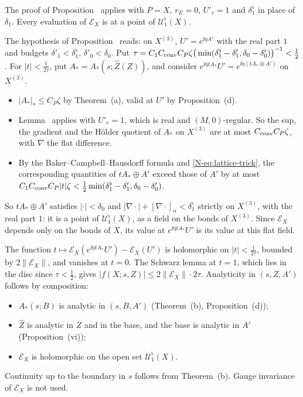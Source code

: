 \begin{detail}\label{d11b:gl-composed}
The proof of Proposition~ applies with $P=X$, $r_E=0$, $U'_r=1$ and $\delta_1^\flat$ in place of $\delta_1$. Every evaluation of $\mathcal E_X$ is at a point of $\mathcal U^\flat_1(X)$.
\end{detail}

\begin{step}
The hypothesis of Proposition~ reads: on $X^{(3)}$, $U'=e^{\ii\eta A'}$ with the real part $1$ and budgets $\delta'_1<\delta_1^\flat$, $\delta'_0<\delta_0$. Put $\tau=C_1C_{\rm conv}C_P\zeta\big(\min(\delta_1^\flat-\delta'_1,\delta_0-\delta'_0)\big)^{-1}<\frac12$. For $|t|<\frac1{2\tau}$, put $A_*=A_*(s;\hat Z(Z))$, and consider $e^{\ii\eta tA_*}U'=e^{\ii\eta(tA_*\oplus A')}$ on $X^{(3)}$.
\begin{itemize}
\item $|A_*|_*\le C_P\zeta$ by Theorem~(a), valid at $U'$ by Proposition~(d).
\item Lemma~ applies with $U'_r=1$, which is real and $(M,0)$-regular. So the sup, the gradient and the Hölder quotient of $A_*$ on $X^{(3)}$ are at most $C_{\rm conv}C_P\zeta$, with $\nabla$ the flat difference.
\item By the Baker--Campbell--Hausdorff formula and \eqref{N-eq:lattice-trick}, the corresponding quantities of $tA_*\oplus A'$ exceed those of $A'$ by at most $C_1C_{\rm conv}C_P|t|\zeta<\frac12\min(\delta_1^\flat-\delta'_1,\delta_0-\delta'_0)$.
\end{itemize}
So $tA_*\oplus A'$ satisfies $|\cdot|<\delta_0$ and $|\nabla\cdot|+[\nabla\cdot]_\alpha<\delta_1^\flat$ strictly on $X^{(3)}$, with the real part $1$: it is a point of $\mathcal U^\flat_1(X)$, as a field on the bonds of $X^{(3)}$. Since $\mathcal E_X$ depends only on the bonds of $X$, its value at $e^{\ii\eta tA_*}U'$ is its value at this flat field.
\end{step}

\begin{step}
The function $t\mapsto\mathcal E_X(e^{\ii\eta tA_*}U')-\mathcal E_X(U')$ is holomorphic on $|t|<\frac1{2\tau}$, bounded by $2\|\mathcal E_X\|$, and vanishes at $t=0$. The Schwarz lemma at $t=1$, which lies in the disc since $\tau<\frac12$, gives $|f(X;s,Z)|\le2\|\mathcal E_X\|\cdot2\tau$. Analyticity in $(s,Z,A')$ follows by composition:
\begin{itemize}
\item $A_*(s;B)$ is analytic in $(s,B,A')$ (Theorem~(b), Proposition~(d));
\item $\hat Z$ is analytic in $Z$ and in the base, and the base is analytic in $A'$ (Proposition~(vi));
\item $\mathcal E_X$ is holomorphic on the open set $\mathcal U^\flat_1(X)$.
\end{itemize}
Continuity up to the boundary in $s$ follows from Theorem~(b). Gauge invariance of $\mathcal E_X$ is not used.
\end{step}

